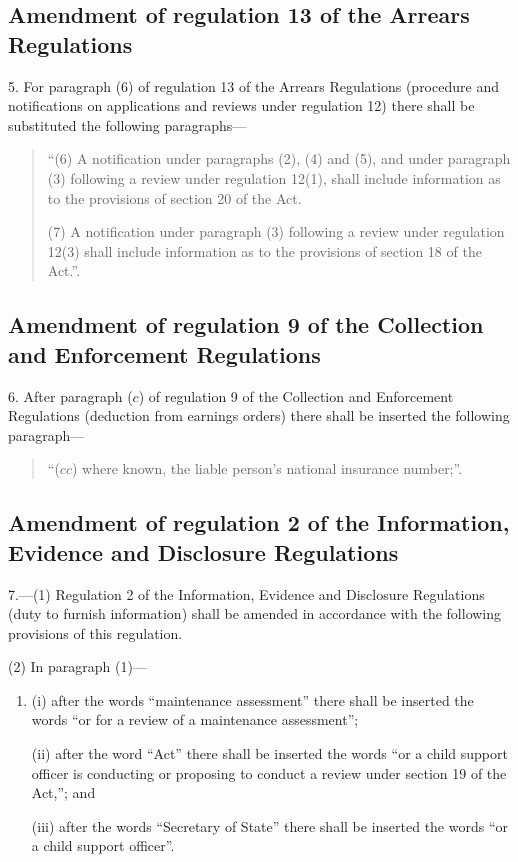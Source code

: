 \documentclass[12pt,a4paper]{article}
\begin{document}
\subsection[5. Amendment of regulation 13 of the Arrears Regulations]{Amendment of regulation 13 of the Arrears Regulations}

5.  For paragraph (6) of regulation 13 of the Arrears Regulations (procedure and notifications on applications and reviews under regulation 12) there shall be substituted the following paragraphs—
\begin{quotation}
“(6) A notification under paragraphs (2), (4) and (5), and under paragraph (3) following a review under regulation 12(1), shall include information as to the provisions of section 20 of the Act.

(7) A notification under paragraph (3) following a review under regulation 12(3) shall include information as to the provisions of section 18 of the Act.”.
\end{quotation}

\subsection[6. Amendment of regulation 9 of the Collection and Enforcement Regulations]{Amendment of regulation 9 of the Collection and Enforcement Regulations}

6.  After paragraph ($c$) of regulation 9 of the Collection and Enforcement Regulations (deduction from earnings orders) there shall be inserted the following paragraph—
\begin{quotation}
“($cc$) where known, the liable person’s national insurance number;”.
\end{quotation}

\subsection[7. Amendment of regulation 2 of the Information, Evidence and Disclosure Regulations]{Amendment of regulation 2 of the Information, Evidence and Disclosure Regulations}

7.—(1) Regulation 2 of the Information, Evidence and Disclosure Regulations (duty to furnish information) shall be amended in accordance with the following provisions of this regulation.

(2) In paragraph (1)—
\begin{enumerate}\item[]
(i) after the words “maintenance assessment” there shall be inserted the words “or for a review of a maintenance assessment”;

(ii) after the word “Act” there shall be inserted the words “or a child support officer is conducting or proposing to conduct a review under section 19 of the Act,”; and

(iii) after the words “Secretary of State” there shall be inserted the words “or a child support officer”.
\end{enumerate}
\end{document}
